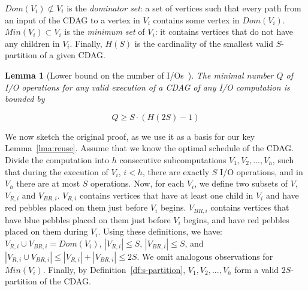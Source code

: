 \documentclass[sigplan,review,anonymous]{acmart}\settopmatter{printfolios=true,printccs=false,printacmref=false}
\newtheorem{lma}{Lemma}
\begin{document}
$Dom(V_i) \not \subset V_i$ is the \emph{dominator set}: a set of vertices such 
that
every path from an input of the CDAG to a vertex in $V_i$ contains some 
vertex in
$Dom(V_i)$.
%
$Min(V_i) \subset V_i$ is the \emph{minimum set} of $V_i$: it contains vertices
that do not have any children in $V_i$. 
%
%
Finally, $H(S)$ is the cardinality of the smallest valid $S$-partition of a
given CDAG.



\begin{lma}[Lower bound on the number of I/Os~\cite{redblue}]
	\label{lma:spartlemma}
	The minimal number $Q$ of I/O operations for any valid execution of a CDAG 
	of
	any I/O computation is bounded by
	
	\begin{equation}
	\label{eq:redbluebound}
	Q \ge S \cdot (H(2S) - 1)
	\end{equation}
\end{lma}

 We now sketch the original proof, as we use it as a basis for our key 
 Lemma~\ref{lma:reuse}.
Assume that we know the optimal schedule of the CDAG. Divide the computation
into $h$ consecutive subcomputations $V_1, V_2, ..., V_h$, such that during the
execution of $V_i$, $i < h$, there are exactly $S$ I/O operations, and in $V_h$
there are at most $S$ operations. Now, for each $V_i$, we define two subsets of
$V$, $V_{R,i}$ and $V_{BR,i}$.
%
%
$V_{R,i}$ contains vertices that have at least one child in $V_i$ and have red 
pebbles placed on them just before
$V_i$ begins.
%
$V_{BR,i}$ contains vertices that have blue pebbles placed on them just before
$V_i$ begins, and have red pebbles placed on them during $V_i$.
%
%
%
%
Using these definitions, we have:  $V_{R,i} \cup V_{BR,i} =
Dom(V_i)$,  $|V_{R,i}| \le S$,  $|V_{BR,i}| \le S$, and
 $|V_{R,i} \cup V_{BR,i}| \le |V_{R,i}| + |V_{BR,i}| \le 2S$.
% 
% 
We omit analogous observations for $Min(V_i)$. 
%
Finally, by Definition~\ref{df:s-partition}, $V_1, V_2, ..., V_h$ form a valid
$2S$-partition of the CDAG. 
\end{document}
